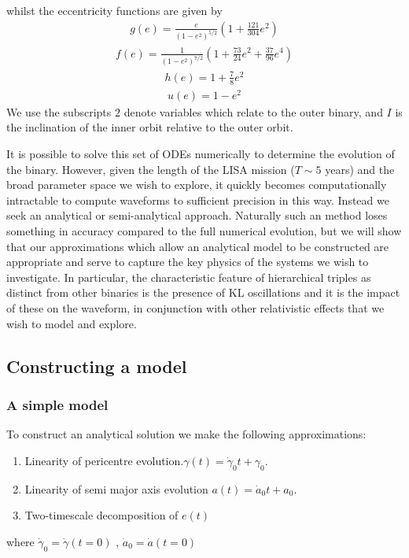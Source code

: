 \documentclass[a4paper,fleqn,usenatbib]{mnras}
\begin{document}
whilst the eccentricity functions are given by
\begin{eqnarray}
g(e) = \frac{e}{\left(1-e^{2}\right)^{5 / 2}}\left(1+\frac{121}{304} e^{2} \right)
\end{eqnarray}
\begin{eqnarray}
f(e) = \frac{1}{\left(1-e^{2}\right)^{7 / 2}}\left(1+\frac{73}{24} e^{2}+\frac{37}{96} e^{4}\right)
\end{eqnarray} 
\begin{eqnarray}
h(e) = 1 + \frac{7}{8} e^2
\end{eqnarray} 
\begin{eqnarray}
u(e) = 1 - e^2
\end{eqnarray} 
We use the subscripts $2$ denote variables which relate to the outer binary, and $I$ is the inclination of the inner orbit relative to the outer orbit. \newline 



\noindent It is possible to solve this set of ODEs numerically to determine the evolution of the binary. However, given the length of the LISA mission ($T \sim 5$ years) and the broad parameter space we wish to explore, it quickly becomes computationally intractable to compute waveforms to sufficient precision in this way. Instead we seek an analytical or semi-analytical approach. Naturally such an method loses something in accuracy compared to the full numerical evolution, but we will show that our approximations which allow an analytical model to be constructed are appropriate and serve to capture the key physics of the systems we wish to investigate. In particular, the characteristic feature of hierarchical triples as distinct from other binaries is the presence of KL oscillations and it is the impact of these on the waveform, in conjunction with other relativistic effects that we wish to model and explore. \newline


\subsection{Constructing a model}





\subsubsection{A simple model}
\noindent To construct an analytical solution we make the following approximations:
\begin{enumerate}
	\item Linearity of pericentre evolution.$\gamma(t) = \dot{\gamma}_0 t + \gamma_0$.
	\item Linearity of semi major axis evolution $a(t) = \dot{a}_0 t + a_0$.
	\item Two-timescale decomposition of $e(t)$
\end{enumerate}
where $\dot{\gamma}_0 = \dot{\gamma} (t=0)$ , $\dot{a}_0 = \dot{a} (t=0)$\newline 
\end{document}
